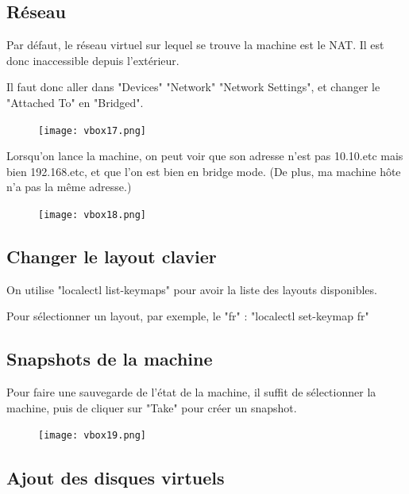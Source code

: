 \documentclass{article}
\begin{document}
\pagebreak

\subsection{Réseau}

Par défaut, le réseau virtuel sur lequel se trouve la machine est le NAT. Il est donc inaccessible depuis l'extérieur.

Il faut donc aller dans "Devices" \textrightarrow "Network" \textrightarrow "Network Settings", et changer le "Attached To" en "Bridged".


\begin{figure}[h!]
		\centering
		\texttt{[image: vbox17.png]}
\end{figure}

Lorsqu'on lance la machine, on peut voir que son adresse n'est pas 10.10.etc mais bien 192.168.etc, et que l'on est bien en bridge mode. (De plus, ma machine hôte n'a pas la même adresse.)

\begin{figure}[h!]
		\centering
		\texttt{[image: vbox18.png]}
\end{figure}

\pagebreak

\subsection{Changer le layout clavier}

On utilise "localectl list-keymaps" pour avoir la liste des layouts disponibles.

Pour sélectionner un layout, par exemple, le "fr" : "localectl set-keymap fr"



\subsection{Snapshots de la machine}

Pour faire une sauvegarde de l'état de la machine, il suffit de sélectionner la machine, puis de cliquer sur "Take" pour créer un snapshot.

\begin{figure}[h!]
		\centering
		\texttt{[image: vbox19.png]}
\end{figure}

\subsection{Ajout des disques virtuels}
\end{document}
